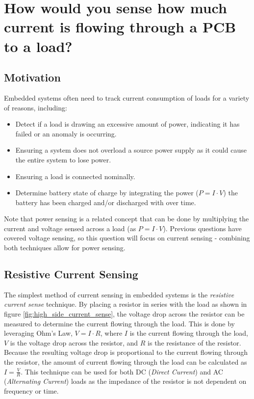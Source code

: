 \documentclass[main.tex]{subfiles}
\begin{document}
\section{How would you sense how much current is flowing through a PCB to a load?}


\spoilerline

\subsection{Motivation}
Embedded systems often need to track current consumption of loads for a variety of reasons, including:
\begin{itemize}
    \item Detect if a load is drawing an excessive amount of power, indicating it has failed or an anomaly is occurring. 
    \item Ensuring a system does not overload a source power supply as it could cause the entire system to lose power. 
    \item Ensuring a load is connected nominally.
    \item Determine battery state of charge by integrating the power ($P = I \cdot V$) the battery has been charged and/or discharged with over time.
\end{itemize}

\noindent Note that power sensing is a related concept that can be done by multiplying the current and voltage sensed across a load (as $P = I \cdot V$). Previous questions have covered voltage sensing, so this question will focus on current sensing - combining both techniques allow for power sensing.

\subsection{Resistive Current Sensing}
The simplest method of current sensing in embedded systems is the \textit{resistive current sense} technique. By placing a resistor in series with the load as shown in figure \ref{fig:high_side_current_sense}, the voltage drop across the resistor can be measured to determine the current flowing through the load. This is done by leveraging Ohm's Law, $V = I \cdot R$, where $I$ is the current flowing through the load, $V$ is the voltage drop across the resistor, and $R$ is the resistance of the resistor. Because the resulting voltage drop is proportional to the current flowing through the resistor, the amount of current flowing through the load can be calculated as $I = \frac{V}{R}$. This technique can be used for both DC (\textit{Direct Current}) and AC (\textit{Alternating Current}) loads as the impedance of the resistor is not dependent on frequency or time.
\end{document}
